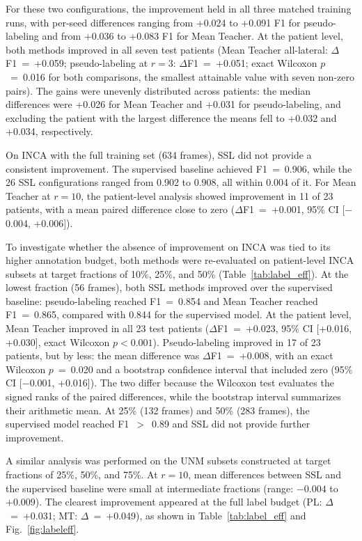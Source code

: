 \documentclass[a4paper,fleqn]{cas-dc}
\begin{document}
For these two configurations, the improvement held in all three matched training runs, with per-seed differences ranging from +0.024 to +0.091 F1 for pseudo-labeling and from +0.036 to +0.083 F1 for Mean Teacher. At the patient level, both methods improved in all seven test patients (Mean Teacher all-lateral: $\Delta$F1~=~+0.059; pseudo-labeling at $r{=}3$: $\Delta$F1~=~+0.051; exact Wilcoxon $p$~=~0.016 for both comparisons, the smallest attainable value with seven non-zero pairs). The gains were unevenly distributed across patients: the median differences were +0.026 for Mean Teacher and +0.031 for pseudo-labeling, and excluding the patient with the largest difference the means fell to +0.032 and +0.034, respectively.

On INCA with the full training set (634 frames), SSL did not provide a consistent improvement. The supervised baseline achieved F1~=~0.906, while the 26 SSL configurations ranged from 0.902 to 0.908, all within 0.004 of it. For Mean Teacher at $r{=}10$, the patient-level analysis showed improvement in 11 of 23 patients, with a mean paired difference close to zero ($\Delta$F1~=~+0.001, 95\% CI [$-$0.004, +0.006]).

To investigate whether the absence of improvement on INCA was tied to its higher annotation budget, both methods were re-evaluated on patient-level INCA subsets at target fractions of 10\%, 25\%, and 50\% (Table~\ref{tab:label_eff}). At the lowest fraction (56 frames), both SSL methods improved over the supervised baseline: pseudo-labeling reached F1~=~0.854 and Mean Teacher reached F1~=~0.865, compared with 0.844 for the supervised model. At the patient level, Mean Teacher improved in all 23 test patients ($\Delta$F1~=~+0.023, 95\% CI [+0.016, +0.030], exact Wilcoxon $p<0.001$). Pseudo-labeling improved in 17 of 23 patients, but by less: the mean difference was $\Delta$F1~=~+0.008, with an exact Wilcoxon $p$~=~0.020 and a bootstrap confidence interval that included zero (95\% CI [$-$0.001, +0.016]). The two differ because the Wilcoxon test evaluates the signed ranks of the paired differences, while the bootstrap interval summarizes their arithmetic mean. At 25\% (132 frames) and 50\% (283 frames), the supervised model reached F1~$>$~0.89 and SSL did not provide further improvement.

A similar analysis was performed on the UNM subsets constructed at target fractions of 25\%, 50\%, and 75\%. At $r{=}10$, mean differences between SSL and the supervised baseline were small at intermediate fractions (range: $-0.004$ to $+0.009$). The clearest improvement appeared at the full label budget (PL: $\Delta$~=~+0.031; MT: $\Delta$~=~+0.049), as shown in Table~\ref{tab:label_eff} and Fig.~\ref{fig:labeleff}.
\end{document}
